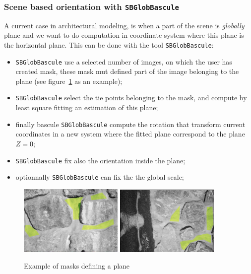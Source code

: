 \subsubsection{Scene based orientation with {\tt SBGlobBascule}}

\label{ScBas:Basc}
 
A current case in architectural modeling, is when a part of the
scene is \emph{globally} plane and we want to do computation in
coordinate system where this plane is the horizontal plane. 
This can be done with the tool {\tt SBGlobBascule}:



\begin{itemize}
   \item {\tt SBGlobBascule} use a selected number of images, on which the
         user has created mask, these mask mut defined part of the image
         belonging to the plane (see figure~\ref{FIG:MaskPlane:StMartin} as an
         example);

   \item {\tt SBGlobBascule} select the tie points belonging to the mask, and
         compute by least square fitting an estimation of this  plane;


   \item finally bascule {\tt SBGlobBascule} compute the rotation that transform
         current coordinates in a new system where the fitted plane correspond to 
         the plane $Z=0$;

    \item {\tt SBGlobBascule}  fix  also the orientation inside the plane;

    \item optionnally {\tt SBGlobBascule}  can fix the  the global scale;
\end{itemize}


\begin{figure}[H]
\begin{center}
\includegraphics[width=50mm]{FIGS/MurSaintMartin/Plan1.jpg}
\includegraphics[width=50mm]{FIGS/MurSaintMartin/Plan2.jpg}
\end{center}
\caption{Example of masks defining a plane}
\label{FIG:MaskPlane:StMartin}
\end{figure}


